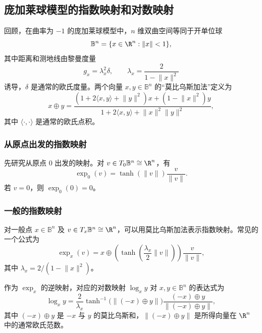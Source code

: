 \subsection{庞加莱球模型的指数映射和对数映射}
回顾，在曲率为 $-1$ 的庞加莱球模型中，$n$ 维双曲空间等同于开单位球
\[
  \mathbb B^n=\{x\in\R^n:\lVert x\rVert<1\},
\]
其中距离和测地线由黎曼度量
\[
  g_x=\lambda_x^2\delta,\qquad \lambda_x=\frac{2}{1-\lVert x\rVert^2}
\]
诱导，$\delta$ 是通常的欧氏度量。两个向量 $x,y\in\mathbb B^n$ 的“莫比乌斯加法”定义为
\begin{equation*}
  x\oplus y
    =\frac{(1+2\langle x,y\rangle+\lVert y\rVert^2)x+(1-\lVert x\rVert^2)y}
           {1+2\langle x,y\rangle+\lVert x\rVert^2\lVert y\rVert^2},
  \tag{2.128}\label{eq:2.128}
\end{equation*}
其中 $\langle\cdot,\cdot\rangle$ 是通常的欧氏点积。

\subsubsection{从原点出发的指数映射}
先研究从原点 $0$ 出发的映射。对 $v\in T_0\mathbb B^n\cong\R^n$，有
\begin{equation*}
  \exp_0(v)=\tanh(\lVert v\rVert)\frac{v}{\lVert v\rVert}.
  \tag{2.129}\label{eq:2.129}
\end{equation*}
若 $v=0$，则 $\exp_0(0)=0$。

\subsubsection{一般的指数映射}
对一般点 $x\in\mathbb B^n$ 及 $v\in T_x\mathbb B^n\cong\R^n$，可以用莫比乌斯加法表示指数映射。常见的一个公式为
\begin{equation*}
  \exp_x(v)=x\oplus\left(\tanh\left(\frac{\lambda_x}{2}\lVert v\rVert\right)\right)
               \frac{v}{\lVert v\rVert},
  \tag{2.130}\label{eq:2.130}
\end{equation*}
其中 $\lambda_x=2/(1-\lVert x\rVert^2)$。

作为 $\exp_x$ 的逆映射，对应的对数映射 $\log_x y$ 对 $x,y\in\mathbb B^n$ 的表达式为
\begin{equation*}
  \log_x y=\frac{2}{\lambda_x}\tanh^{-1}\bigl(\lVert(-x)\oplus y\rVert\bigr)
             \frac{(-x)\oplus y}{\lVert(-x)\oplus y\rVert},
  \tag{2.131}\label{eq:2.131}
\end{equation*}
其中 $(-x)\oplus y$ 是 $-x$ 与 $y$ 的莫比乌斯和，$\lVert(-x)\oplus y\rVert$ 是所得向量在 $\R^n$ 中的通常欧氏范数。
